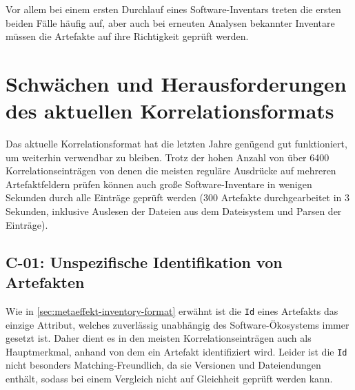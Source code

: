 Vor allem bei einem ersten Durchlauf eines Software-Inventars treten die ersten beiden Fälle häufig auf, aber auch bei erneuten Analysen bekannter Inventare müssen die Artefakte auf ihre Richtigkeit geprüft werden.


\section{Schwächen und Herausforderungen des aktuellen Korrelationsformats}\label{sec:current-correlation-weaknesses}


Das aktuelle Korrelationsformat hat die letzten Jahre genügend gut funktioniert, um weiterhin verwendbar zu bleiben.
Trotz der hohen Anzahl von über 6400 Korrelationseinträgen von denen die meisten reguläre Ausdrücke auf mehreren Artefaktfeldern prüfen können auch große Software-Inventare in wenigen Sekunden durch alle Einträge geprüft werden (300 Artefakte durchgearbeitet in 3 Sekunden, inklusive Auslesen der Dateien aus dem Dateisystem und Parsen der Einträge).

\subsection{C-01: Unspezifische Identifikation von Artefakten}\label{subsec:c-01-unspezifische-identifikation-von-artefakten}

%
%

Wie in \autoref{sec:metaeffekt-inventory-format} erwähnt ist die \texttt{Id} eines Artefakts das einzige Attribut, welches zuverlässig unabhängig des Software-Ökosystems immer gesetzt ist.
Daher dient es in den meisten Korrelationseinträgen auch als Hauptmerkmal, anhand von dem ein Artefakt identifiziert wird.
Leider ist die \texttt{Id} nicht besonders Matching-Freundlich, da sie Versionen und Dateiendungen enthält, sodass bei einem Vergleich nicht auf Gleichheit geprüft werden kann.

